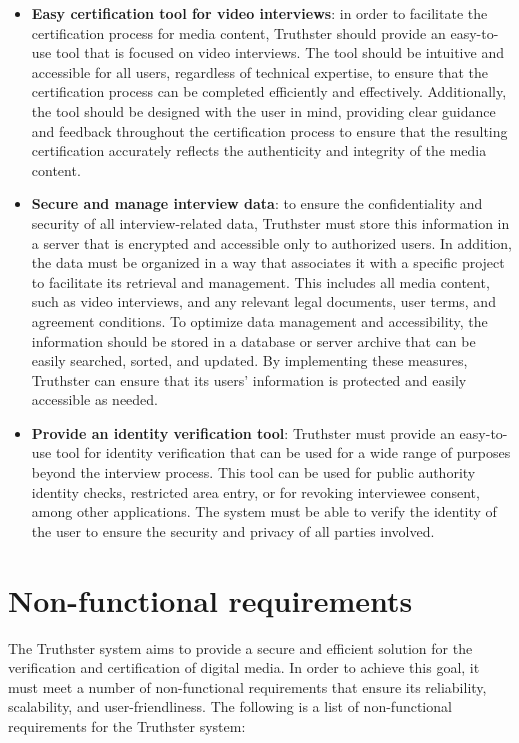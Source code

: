\documentclass[target=mst,aauheader=]{thud}
\begin{document}
\begin{itemize}
    \item \textbf{Easy certification tool for video interviews}: in order to facilitate the certification process for media content, Truthster should provide an easy-to-use tool that is focused on video interviews. The tool should be intuitive and accessible for all users, regardless of technical expertise, to ensure that the certification process can be completed efficiently and effectively. Additionally, the tool should be designed with the user in mind, providing clear guidance and feedback throughout the certification process to ensure that the resulting certification accurately reflects the authenticity and integrity of the media content.
    \item \textbf{Secure and manage interview data}: to ensure the confidentiality and security of all interview-related data, Truthster must store this information in a server that is encrypted and accessible only to authorized users. In addition, the data must be organized in a way that associates it with a specific project to facilitate its retrieval and management. This includes all media content, such as video interviews, and any relevant legal documents, user terms, and agreement conditions. To optimize data management and accessibility, the information should be stored in a database or server archive that can be easily searched, sorted, and updated. By implementing these measures, Truthster can ensure that its users' information is protected and easily accessible as needed.
    \item \textbf{Provide an identity verification tool}: Truthster must provide an easy-to-use tool for identity verification that can be used for a wide range of purposes beyond the interview process. This tool can be used for public authority identity checks, restricted area entry, or for revoking interviewee consent, among other applications. The system must be able to verify the identity of the user to ensure the security and privacy of all parties involved.
    
\end{itemize}

\section{Non-functional requirements}

The Truthster system aims to provide a secure and efficient solution for the verification and certification of digital media. In order to achieve this goal, it must meet a number of non-functional requirements that ensure its reliability, scalability, and user-friendliness. The following is a list of non-functional requirements for the Truthster system:\\
\end{document}
